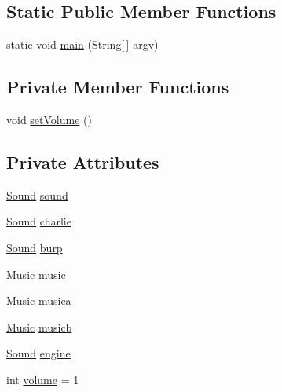 \subsection*{Static Public Member Functions}
\begin{DoxyCompactItemize}
\item 
static void \mbox{\hyperlink{classorg_1_1newdawn_1_1slick_1_1tests_1_1_sound_u_r_l_test_a576b6c1548dfe7a5885853f4cddc0086}{main}} (String\mbox{[}$\,$\mbox{]} argv)
\end{DoxyCompactItemize}
\subsection*{Private Member Functions}
\begin{DoxyCompactItemize}
\item 
void \mbox{\hyperlink{classorg_1_1newdawn_1_1slick_1_1tests_1_1_sound_u_r_l_test_aed79b291956c094f92082480bd818df7}{set\+Volume}} ()
\end{DoxyCompactItemize}
\subsection*{Private Attributes}
\begin{DoxyCompactItemize}
\item 
\mbox{\hyperlink{classorg_1_1newdawn_1_1slick_1_1_sound}{Sound}} \mbox{\hyperlink{classorg_1_1newdawn_1_1slick_1_1tests_1_1_sound_u_r_l_test_ab150fd35e50f91877ded465e208d26a0}{sound}}
\item 
\mbox{\hyperlink{classorg_1_1newdawn_1_1slick_1_1_sound}{Sound}} \mbox{\hyperlink{classorg_1_1newdawn_1_1slick_1_1tests_1_1_sound_u_r_l_test_a5806820024f40319f19973c5898df29f}{charlie}}
\item 
\mbox{\hyperlink{classorg_1_1newdawn_1_1slick_1_1_sound}{Sound}} \mbox{\hyperlink{classorg_1_1newdawn_1_1slick_1_1tests_1_1_sound_u_r_l_test_ab2a8a13c8051ebda18fe29e2f31b24b3}{burp}}
\item 
\mbox{\hyperlink{classorg_1_1newdawn_1_1slick_1_1_music}{Music}} \mbox{\hyperlink{classorg_1_1newdawn_1_1slick_1_1tests_1_1_sound_u_r_l_test_ab3104882d68cde6d826346758faec7fb}{music}}
\item 
\mbox{\hyperlink{classorg_1_1newdawn_1_1slick_1_1_music}{Music}} \mbox{\hyperlink{classorg_1_1newdawn_1_1slick_1_1tests_1_1_sound_u_r_l_test_a140b3587b3f01282ba0d26ee65dc3944}{musica}}
\item 
\mbox{\hyperlink{classorg_1_1newdawn_1_1slick_1_1_music}{Music}} \mbox{\hyperlink{classorg_1_1newdawn_1_1slick_1_1tests_1_1_sound_u_r_l_test_a914a174ac8607249f88d11c614026c2b}{musicb}}
\item 
\mbox{\hyperlink{classorg_1_1newdawn_1_1slick_1_1_sound}{Sound}} \mbox{\hyperlink{classorg_1_1newdawn_1_1slick_1_1tests_1_1_sound_u_r_l_test_a6a0807b2ab81a3514960bcc33ebea163}{engine}}
\item 
int \mbox{\hyperlink{classorg_1_1newdawn_1_1slick_1_1tests_1_1_sound_u_r_l_test_ac1ddaaa87f02c72f643d03cf7a6014db}{volume}} = 1
\end{DoxyCompactItemize}
